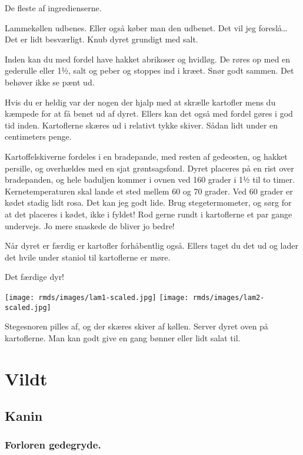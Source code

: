 \documentclass[
  letterpaper,
  DIV=11,
  numbers=noendperiod]{scrreprt}
\begin{document}
De fleste af ingredienserne.

Lammekøllen udbenes. Eller også køber man den udbenet. Det vil jeg
foreslå\ldots{} Det er lidt besværligt. Knub dyret grundigt med salt.

Inden kan du med fordel have hakket abrikoser og hvidløg. De røres op
med en gederulle eller 1½, salt og peber og stoppes ind i kræet. Snør
godt sammen. Det behøver ikke se pænt ud.

Hvis du er heldig var der nogen der hjalp med at skrælle kartofler mens
du kæmpede for at få benet ud af dyret. Ellers kan det også med fordel
gøres i god tid inden. Kartoflerne skæres ud i relativt tykke skiver.
Sådan lidt under en centimeters penge.

Kartoffelskiverne fordeles i en bradepande, med resten af gedeosten, og
hakket persille, og overhældes med en sjat grøntsagsfond. Dyret placeres
på en rist over bradepanden, og hele baduljen kommer i ovnen ved 160
grader i 1½ til to timer. Kernetemperaturen skal lande et sted mellem 60
og 70 grader. Ved 60 grader er kødet stadig lidt rosa. Det kan jeg godt
lide. Brug stegetermometer, og sørg for at det placeres i kødet, ikke i
fyldet! Rod gerne rundt i kartoflerne et par gange undervejs. Jo mere
snaskede de bliver jo bedre!

Når dyret er færdig er kartofler forhåbentlig også. Ellers taget du det
ud og lader det hvile under staniol til kartoflerne er møre.

Det færdige dyr!

\texttt{[image: rmds/images/lam1-scaled.jpg]}
\texttt{[image: rmds/images/lam2-scaled.jpg]}

Stegesnoren pilles af, og der skæres skiver af køllen. Server dyret oven
på kartoflerne. Man kan godt give en gang bønner eller lidt salat til.


\hypertarget{vildt}{%
\chapter{Vildt}\label{vildt}}

\hypertarget{kanin}{%
\section{Kanin}\label{kanin}}

\hypertarget{forloren-gedegryde.}{%
\subsection{Forloren gedegryde.}\label{forloren-gedegryde.}}
\end{document}

